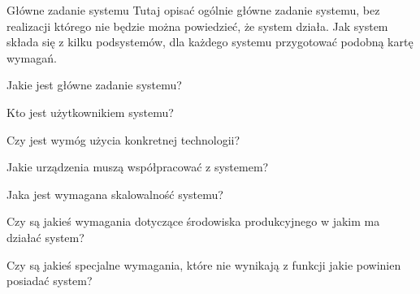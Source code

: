 \documentclass[a4paper]{article}
\begin{document}
    \begin{userstory}{Główne zadanie systemu}
        Tutaj opisać ogólnie główne zadanie systemu, bez realizacji którego nie będzie można powiedzieć, że system działa. Jak system składa się z kilku podsystemów, dla każdego systemu przygotować podobną kartę wymagań.
        \begin{questions}
            \item{
                Jakie jest główne zadanie systemu?
            }
            \item{
                Kto jest użytkownikiem systemu?
            }
            \item{
                Czy jest wymóg użycia konkretnej technologii?
            }
            \item{
                Jakie urządzenia muszą współpracować z systemem?
            }
            \item{
                Jaka jest wymagana skalowalność systemu?
            }
            \item{
                Czy są jakieś wymagania dotyczące środowiska produkcyjnego w jakim ma działać system?
            }
            \item{
                Czy są jakieś specjalne wymagania, które nie wynikają z funkcji jakie powinien posiadać system?
            }
        \end{questions}
    \end{userstory}
\end{document}
